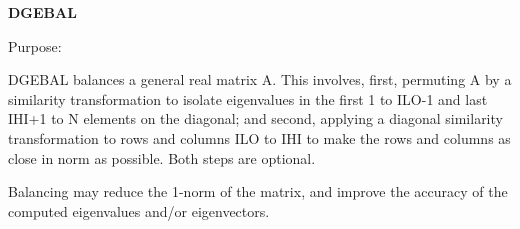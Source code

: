 {\bfseries D\+G\+E\+B\+A\+L} 

 \begin{DoxyParagraph}{Purpose\+: }
\begin{DoxyVerb} DGEBAL balances a general real matrix A.  This involves, first,
 permuting A by a similarity transformation to isolate eigenvalues
 in the first 1 to ILO-1 and last IHI+1 to N elements on the
 diagonal; and second, applying a diagonal similarity transformation
 to rows and columns ILO to IHI to make the rows and columns as
 close in norm as possible.  Both steps are optional.

 Balancing may reduce the 1-norm of the matrix, and improve the
 accuracy of the computed eigenvalues and/or eigenvectors.\end{DoxyVerb}
 
\end{DoxyParagraph}

